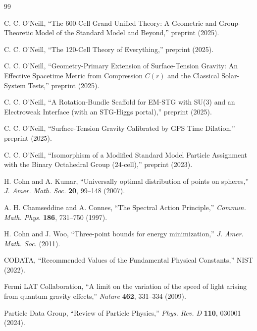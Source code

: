 \documentclass[12pt,a4paper]{article}
\begin{document}
\begin{thebibliography}{99}


C. C. O'Neill, ``The 600-Cell Grand Unified Theory: A Geometric and Group-Theoretic Model of the Standard Model and Beyond,'' preprint (2025).

C. C. O'Neill, ``The 120-Cell Theory of Everything,'' preprint (2025).

C. C. O'Neill, ``Geometry-Primary Extension of Surface-Tension Gravity: An Effective Spacetime Metric from Compression $C(r)$ and the Classical Solar-System Tests,'' preprint (2025).

C. C. O'Neill, ``A Rotation-Bundle Scaffold for EM-STG with SU(3) and an Electroweak Interface (with an STG-Higgs portal),'' preprint (2025).

C. C. O'Neill, ``Surface-Tension Gravity Calibrated by GPS Time Dilation,'' preprint (2025).

C. C. O'Neill, ``Isomorphism of a Modified Standard Model Particle Assignment with the Binary Octahedral Group (24-cell),'' preprint (2023).


H. Cohn and A. Kumar, ``Universally optimal distribution of points on spheres,'' \textit{J. Amer. Math. Soc.} \textbf{20}, 99--148 (2007).

A. H. Chamseddine and A. Connes, ``The Spectral Action Principle,'' \textit{Commun. Math. Phys.} \textbf{186}, 731--750 (1997).

H. Cohn and J. Woo, ``Three-point bounds for energy minimization,'' \textit{J. Amer. Math. Soc.} (2011).


CODATA, ``Recommended Values of the Fundamental Physical Constants,'' NIST (2022).

Fermi LAT Collaboration, ``A limit on the variation of the speed of light arising from quantum gravity effects,'' \textit{Nature} \textbf{462}, 331--334 (2009).

Particle Data Group, ``Review of Particle Physics,'' \textit{Phys. Rev. D} \textbf{110}, 030001 (2024).


\end{thebibliography}
\end{document}
